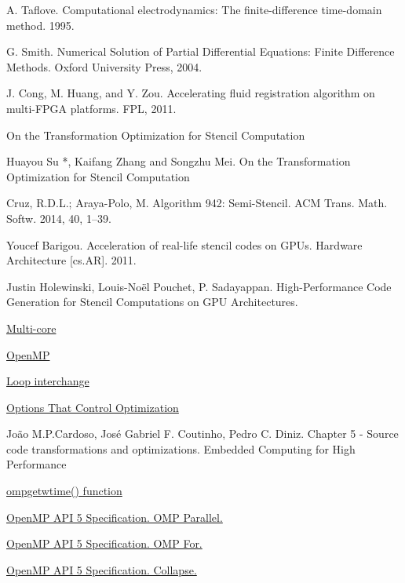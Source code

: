 \documentclass[conference]{IEEEtran}
\begin{document}
\begin{thebibliography}{1}

A. Taflove. Computational electrodynamics: The finite-difference time-domain method. 1995.

G. Smith. Numerical Solution of Partial Differential Equations: Finite Difference Methods. Oxford University Press, 2004.

J. Cong, M. Huang, and Y. Zou. Accelerating fluid registration algorithm on multi-FPGA platforms. FPL, 2011.

On the Transformation Optimization for Stencil Computation

Huayou Su *, Kaifang Zhang and Songzhu Mei. On the Transformation Optimization for Stencil Computation

Cruz, R.D.L.; Araya-Polo, M. Algorithm 942: Semi-Stencil. ACM Trans. Math. Softw. 2014, 40, 1–39.

Youcef Barigou. Acceleration of real-life stencil codes on GPUs. Hardware Architecture [cs.AR]. 2011.

Justin Holewinski, Louis-Noël Pouchet, P. Sadayappan. High-Performance Code Generation for Stencil Computations on GPU Architectures.

\href{https://www.techopedia.com/definition/5305/multicore}{Multi-core}

\href{https://www.openmp.org/}{OpenMP}

\href{https://en.wikipedia.org/wiki/Loop_interchange}{Loop interchange}

\href{https://gcc.gnu.org/onlinedocs/gcc/Optimize-Options.html}{Options That Control Optimization}
 
João M.P.Cardoso, José Gabriel F. Coutinho, Pedro C. Diniz. Chapter 5 - Source code transformations and optimizations. Embedded Computing for High Performance

\href{https://www.openmp.org/spec-html/5.0/openmpsu160.html}{omp\textunderscore get\textunderscore wtime() function}

\href{https://www.openmp.org/specifications/}{OpenMP API 5 Specification. OMP Parallel.}

\href{https://www.openmp.org/specifications/}{OpenMP API 5 Specification. OMP For.}

\href{https://www.openmp.org/specifications/}{OpenMP API 5 Specification. Collapse.}

\end{thebibliography}
\end{document}
